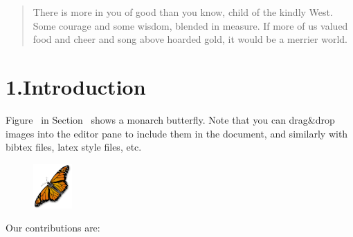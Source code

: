 \documentclass[10pt]{book}
\begin{document}
\mdxtitleblockstart{}
\mdxauthorstart{}


\mdxauthorend\mdxauthorstart{}


\mdxauthorend\mdtitleauthorrunning{}{}\mdxtitleblockend%

\begin{abstract}%

\noindent There is more in you of good than you know, child of the kindly West.
Some courage and some wisdom, blended in measure. If more of us valued
food and cheer and song above hoarded gold, it would be a merrier world.%
\end{abstract}%

\section{1.\hspace*{0.5em}Introduction}\label{sec-intro}%

\noindent Figure~ in Section~ shows a monarch butterfly.
Note that you can drag\&drop images into the editor pane to include them in
the document, and similarly with bibtex files, latex style files, etc.%

\begin{figure}[h]%
\begin{mdcenter}%

\noindent\includegraphics[keepaspectratio=true,width=4em]{images/butterfly}{}%

\mdhr{}%

\noindent{}%
\end{mdcenter}\label{fig-butterfly}%
\end{figure}%

\noindent Our contributions are:%
\end{document}
